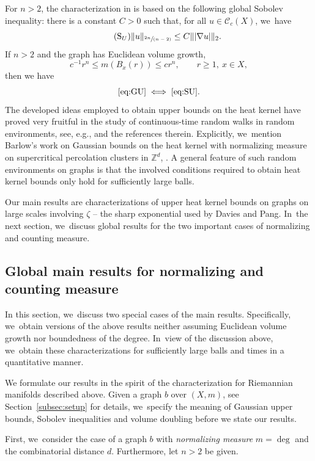 \documentclass[JEP,XML,SOM,Unicode,published]{cedram}
\newcommand{\spfrac}[2]{\sfrac{#1}{(#2)}}
\newcommand{\rS}{\mathrm{S}}
\theoremstyle{plain}
\theoremstyle{definition}
\newcommand{\ZZ}{\mathbb{Z}}
\newcommand{\cC}{\mathcal{C}}
\begin{document}
For $n>2$, the characterization in \cite{Barlow-book} is based on the following global Sobolev inequality: there is a constant $C>0$ such that, for all $u\in \cC_c(X)$, we~have
\begin{equation}\tag{$\rS_U$}\label{eq:SU}
\|u\|_{\spfrac{2n}{n-2}}\leq C\||\nabla u|\|_2.
\end{equation}
If $n>2$ and the graph has Euclidean volume growth, \ie
\[
c^{-1}r^n\leq m(B_x(r))\leq c r^n,\qquad r\geq 1,\ x\in X,
\]
then we have
\[
\eqref{eq:GU} \iff \eqref{eq:SU}.
\]
The developed ideas employed to obtain upper bounds on the heat kernel have proved very fruitful in the study of continuous-time random walks in random environments, see, e.g., \cite{AndresDS-16,ChenKW-20,Bella-22} and the references therein. Explicitly, we~mention Barlow's work on Gaussian bounds on the heat kernel with normalizing measure on supercritical percolation clusters in $\ZZ^d$, \cite{Barlow-04}. A general feature of such random environments on graphs is that the involved conditions required to obtain heat kernel bounds only hold for sufficiently large balls.

Our main results are characterizations of upper heat kernel bounds on graphs on large scales involving $\zeta$ -- the sharp exponential used by Davies and Pang. In~the next section, we~discuss global results for the two important cases of normalizing and counting measure.

\subsection{Global main results for normalizing and counting measure}\label{sub:globalmain}
In this section, we~discuss two special cases of the main results.
Specifically, we~obtain versions of the above results neither assuming Euclidean volume growth nor boundedness of the degree. In~view of the discussion above, we~obtain these characterizations for sufficiently large balls and times in a quantitative manner.

We formulate our results in the spirit of the characterization for Riemannian manifolds described above. Given a graph {$ b $ over $ (X,m) $, see Section~\ref{subsec:setup} for details}, we~specify the meaning of Gaussian upper bounds, Sobolev inequalities and volume doubling before we state our results.

First, we~consider the case of a graph {$ b $} with {\it normalizing measure} $m=\deg$ and the combinatorial distance {$ d $. Furthermore, let $n>2$ be given.}
\end{document}
